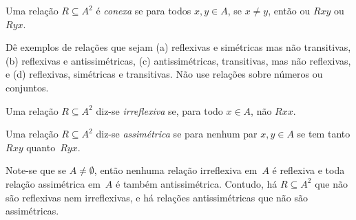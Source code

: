 \documentclass[../../../include/open-logic-section]{subfiles}
\begin{document}
\begin{defn}[Conexidade]
Uma relação $R \subseteq A^2$ é \emph{conexa} se para todos $x,y\in
A$, se $x \neq y$, então ou $Rxy$ ou~$Ryx$.
\end{defn}

\begin{prob}
Dê exemplos de relações que sejam (a) reflexivas e simétricas mas
não transitivas, (b) reflexivas e antissimétricas, (c) antissimétricas,
transitivas, mas não reflexivas, e (d) reflexivas, simétricas e
transitivas. Não use relações sobre números ou conjuntos.
\end{prob} 
 
\begin{defn}[Irreflexividade]
Uma relação $R \subseteq A^2$ diz-se \emph{irreflexiva} se, para todo $x \in
A$, não $Rxx$. 
\end{defn}

\begin{defn}[Assimetria]
Uma relação $R \subseteq A^2$ diz-se \emph{assimétrica} se para nenhum par $x,y\in
A$ se tem tanto $Rxy$ quanto~$Ryx$. 
\end{defn}

Note-se que se $A \neq \emptyset$, então nenhuma relação irreflexiva em~$A$
é reflexiva e toda relação assimétrica em~$A$ é também
antissimétrica. Contudo, há $R \subseteq A^2$ que não são
reflexivas nem irreflexivas, e há relações antissimétricas
que não são assimétricas. 
\end{document}
